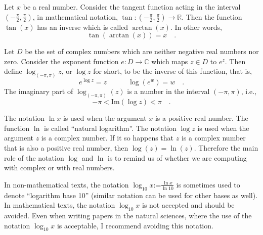 \documentclass[12pt]{book}
\renewcommand{\Im}{\mathrm{Im}}
\newcommand{\eqdef}{\textbf{:=}}
\begin{document}
Let $x$ be a real number. Consider the tangent function acting in the interval $(-\frac{\pi}{2}, \frac{\pi}{2})$, in mathematical notation, $\tan :(-\frac{\pi}{2}, \frac{\pi}{2})\to \mathbb R$. Then the function $\tan(x)$ has an inverse which is called $\arctan(x)$. In other words,
\[
\tan (\arctan(x))= x\quad .
\]

Let $D$ be the set of complex numbers which are neither negative real numbers nor zero. Consider the exponent function $e: D\to \mathbb C$ which maps $z\in D$ to $e^z$. Then define $\log_{(-\pi,\pi)} z$, or $\log z$ for short, to be the inverse of this function, that is,
\begin{equation}\boxed{
e^{\log z} = z\quad \quad \quad \log (e^w)=w\quad .
}
\end{equation}
The imaginary part of $\log_{(-\pi,\pi)}(z)$ is a number in the interval $(-\pi,\pi)$, i.e.,
\[
-\pi<\Im(\log z)<\pi\quad .
\]

The notation $\ln x$  is used when the argument $x$ is a positive real number. The function $\ln$ is called ``natural logarithm''. The notation $\log z$ is used when the argument $z$ is a complex number. If it so happens that $z$ is a complex number that is also a positive real number, then $\log(z)=\ln(z)$. Therefore the main role of the notation $\log$ and $\ln$ is to remind us of whether we are computing with complex or with real numbers.

In non-mathematical texts, the notation $\log_{10} x\eqdef \frac{\ln x}{\ln 10}$ is sometimes used to denote ``logarithm base 10'' (similar notation can be used for other bases as well). In mathematical texts, the notation $\log_{10} x$ is not accepted and should be avoided. Even when writing papers in the natural sciences, where the use of the notation $\log_{10} x$ is acceptable, I  recommend avoiding this notation.
\end{document}
